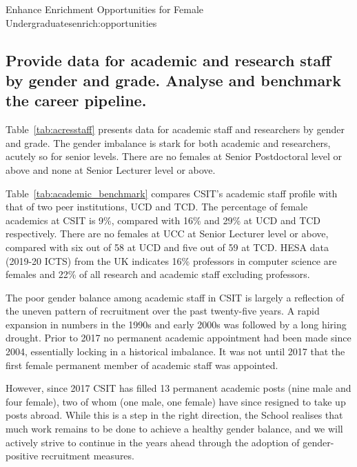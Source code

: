 \begin{actionblock}{\ksspace{}Enhance Enrichment Opportunities for Female Undergraduates}{enrich:opportunities}
\actenrichopportunities
\hfill{
    \hypersetup{hidelinks}
    \hyperlink{b5}{\gotoactionsymbol{}}
}
\end{actionblock}




\subsection{Provide data for academic and research staff by gender and grade. Analyse and benchmark the career pipeline.}
\label{subsec:academic_research}






Table~\ref{tab:acresstaff} presents data for academic staff and researchers
by gender and grade. 
The gender imbalance is stark for both academic and researchers, 
acutely so for senior levels. There are no females at Senior Postdoctoral 
level or above  and none at Senior Lecturer level or above. 

Table~\ref{tab:academic_benchmark} compares CSIT's academic
staff profile with that of two peer institutions, \ac{UCD} 
and \ac{TCD}.
The percentage of female academics at CSIT is 9\%, 
compared with 16\% and 29\% at UCD and TCD 
respectively. There are no females at UCC at Senior Lecturer
level or above, compared with six out of 58 at UCD and five 
out of 59 at TCD. \ac{HESA} data  (2019-20 ICTS) from the 
UK indicates 16\% professors in computer science are females 
and 22\% of all research and academic staff excluding professors.



The poor gender balance among academic staff in CSIT is largely 
a reflection of the uneven pattern of recruitment over the past 
twenty-five years. 
A rapid expansion in numbers in the 1990s and early 2000s was
followed by a long hiring drought. Prior to 2017 no permanent
academic appointment had been made since 2004, essentially 
locking in a historical imbalance. It was not until 2017 that
the first female permanent member of academic staff was appointed.

However, since 2017 CSIT has filled 13 permanent academic posts 
(nine male and four female), two of whom (one male, one female)
have since resigned to take up posts abroad.
While this is a step in the right direction, the School realises that 
much work remains to be done to achieve a healthy gender balance, and
we will actively strive to continue in
the years ahead through the adoption of gender-positive recruitment
measures. 



